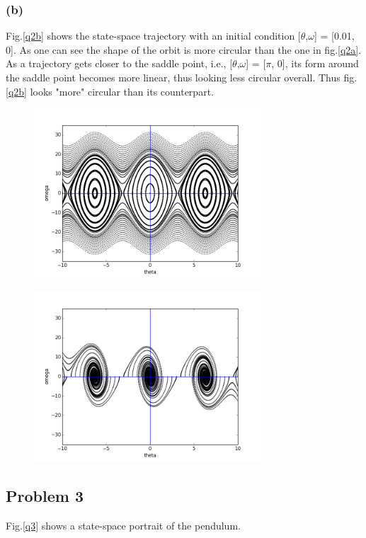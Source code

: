 \documentclass{article}
\begin{document}
\subsubsection*{(b)}
Fig.\ref{q2b} shows the state-space trajectory with an initial condition [$\theta$,$\omega$] = [0.01, 0]. As one can see the shape of the orbit is more circular than the one in fig.\ref{q2a}.
As a trajectory gets closer to the saddle point, i.e., [$\theta$,$\omega$] = [$\pi$, 0], its form around the saddle point becomes more linear, thus looking less circular overall. Thus fig.\ref{q2b} looks "more" circular than its counterpart.

\begin{figure}
\centering
\begin{minipage}{.5\textwidth}
  \centering
  \includegraphics[height=2.5in]{figs/Q3.png}
  \label{q3}
\end{minipage}%
\begin{minipage}{.5\textwidth}
  \centering
  \includegraphics[height=2.5in]{figs/Q4.png}
  \label{q4}
\end{minipage}
\end{figure}

\subsection*{Problem 3}
Fig.\ref{q3} shows a state-space portrait of the pendulum.
\end{document}

